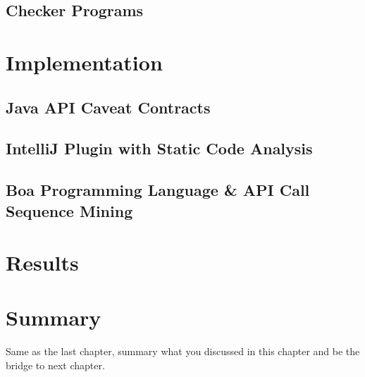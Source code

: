 \subsection{Checker Programs}

\section{Implementation}
\label{sec:contract-implement}

\subsection{Java API Caveat Contracts}
\label{subsec:contract-caveat-contracts}

\subsection{IntelliJ Plugin with Static Code Analysis}
\label{subsec:contract-plugin}

\subsection{Boa Programming Language \& API Call Sequence Mining}
\label{subsec:contract-boa}

\section{Results}
\label{sec:contract-results}


\section{Summary}
\label{sec:contract-summary}
Same as the last chapter, summary what you discussed in this chapter and
be the bridge to next chapter.
